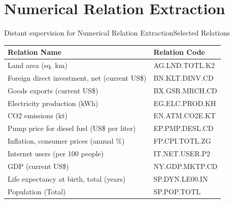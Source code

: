 \documentclass{beamer}
\begin{document}
\section{Numerical Relation Extraction}




\begin{frame}{Distant supervision for Numerical Relation Extraction}{Selected Relations}
 \begin{center}
\begin{tabular}{|l|l|}
\hline
Relation Name & Relation Code \\
\hline
Land area (sq. km)&AG.LND.TOTL.K2\\
Foreign direct investment, net (current US\$)&BN.KLT.DINV.CD\\
Goods exports (current US\$)&BX.GSR.MRCH.CD\\
Electricity production (kWh)&EG.ELC.PROD.KH\\
CO2 emissions (kt)&EN.ATM.CO2E.KT\\
Pump price for diesel fuel (US\$ per liter)&EP.PMP.DESL.CD\\
Inflation, consumer prices (annual \%)&FP.CPI.TOTL.ZG\\
Internet users (per 100 people)&IT.NET.USER.P2\\
GDP (current US\$)&NY.GDP.MKTP.CD\\
Life expectancy at birth, total (years)&SP.DYN.LE00.IN\\
Population (Total)&SP.POP.TOTL\\
\hline
\end{tabular}
\end{center}

\end{frame}
\end{document}
